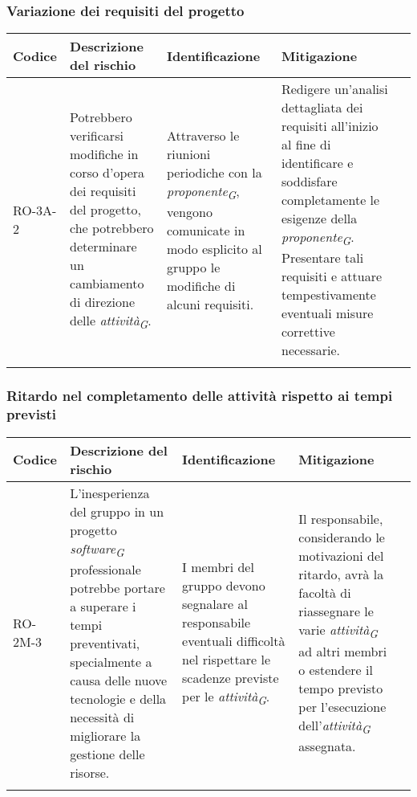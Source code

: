 \subsubsection{Variazione dei requisiti del progetto}
\begin{table}[H]
    \centering
    \begin{tabularx}{\textwidth}{l>{\RaggedRight}X>{\RaggedRight}X>{\RaggedRight}X>{\RaggedRight}X}
    \toprule
    \rowcolor{gray!50}
    \textbf{Codice} & \textbf{Descrizione del rischio} & \textbf{Identificazione} & \textbf{Mitigazione} \\
    \midrule
    \addlinespace 
    RO-3A-2 & 
    Potrebbero verificarsi modifiche in corso d'opera dei requisiti del progetto, che potrebbero determinare un cambiamento di direzione delle \textit{attività}\textsubscript{\textit{G}}. &
    Attraverso le riunioni periodiche con la \textit{proponente}\textsubscript{\textit{G}}, vengono comunicate in modo esplicito al gruppo le modifiche di alcuni requisiti. &
    Redigere un'analisi dettagliata dei requisiti all'inizio al fine di identificare e soddisfare completamente le esigenze della \textit{proponente}\textsubscript{\textit{G}}. Presentare tali requisiti e attuare tempestivamente eventuali misure correttive necessarie.\\
    \bottomrule
    \addlinespace 
    \end{tabularx}
\end{table}

\vspace{2cm}

\subsubsection{Ritardo nel completamento delle attività rispetto ai tempi previsti} \label{sec:ritAttivita}
\begin{table}[H]
    \centering
    \begin{tabularx}{\textwidth}{l>{\RaggedRight}X>{\RaggedRight}X>{\RaggedRight}X>{\RaggedRight}X}
    \toprule
    \rowcolor{gray!50}
    \textbf{Codice} & \textbf{Descrizione del rischio} & \textbf{Identificazione} & \textbf{Mitigazione}\\
    \midrule
    \addlinespace 
    RO-2M-3 & 
    L'inesperienza del gruppo in un progetto \textit{software}\textsubscript{\textit{G}} professionale potrebbe portare a superare i tempi preventivati, specialmente a causa delle nuove tecnologie e della necessità di migliorare la gestione delle risorse.& 
    I membri del gruppo devono segnalare al responsabile eventuali difficoltà nel rispettare le scadenze previste per le \textit{attività}\textsubscript{\textit{G}}.&
    Il responsabile, considerando le motivazioni del ritardo, avrà la facoltà di riassegnare le varie \textit{attività}\textsubscript{\textit{G}} ad altri membri o estendere il tempo previsto per l'esecuzione dell'\textit{attività}\textsubscript{\textit{G}} assegnata.\\
    \bottomrule
    \addlinespace 
    \end{tabularx}
\end{table}

